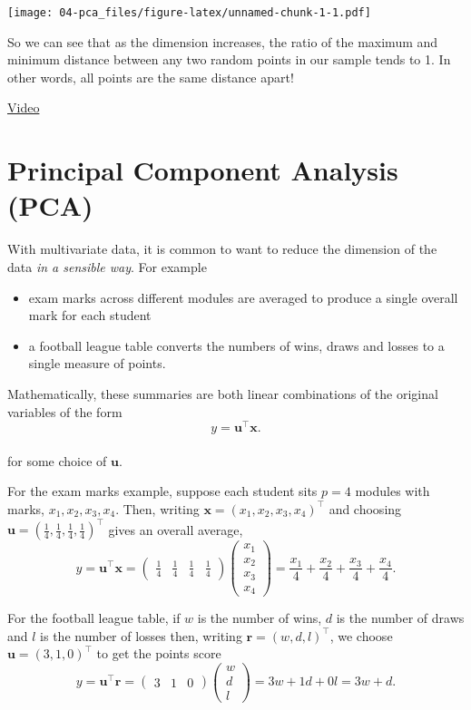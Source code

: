 \documentclass[]{book}
\theoremstyle{definition}
\theoremstyle{definition}
\theoremstyle{definition}
\theoremstyle{remark}
\begin{document}
\texttt{[image: 04-pca\_files/figure-latex/unnamed-chunk-1-1.pdf]}

So we can see that as the dimension increases, the ratio of the maximum and minimum distance between any two random points in our sample tends to 1. In other words, all points are the same distance apart!

\href{https://mediaspace.nottingham.ac.uk/media/Part+IIA+Dimension+reduction+introduction/1_0s2cgr1r}{Video}

\hypertarget{pca}{%
\chapter{Principal Component Analysis (PCA)}\label{pca}}

With multivariate data, it is common to want to reduce the dimension of the data \emph{in a sensible way}. For example

\begin{itemize}
\item
  exam marks across different modules are
  averaged to produce a single overall mark for each
  student
\item
  a football league table converts the
  numbers of wins, draws and losses to a single measure of
  points.
\end{itemize}

Mathematically, these summaries
are both linear combinations of the
original variables of the form
\[y = \mathbf u^\top \mathbf x.\]\\
for some choice of \(\mathbf u\).

For the exam marks example, suppose each student sits \(p=4\) modules
with marks, \(x_1,x_2,x_3,x_4\). Then, writing \(\mathbf x=(x_1, x_2 , x_3, x_4)^\top\) and choosing \(\mathbf u= \left(\frac{1}{4}, \frac{1}{4}, \frac{1}{4}, \frac{1}{4} \right)^\top\)
gives an overall average,
\[ y =\mathbf u^\top \mathbf x= \begin{pmatrix} \frac{1}{4} & \frac{1}{4} & \frac{1}{4} & \frac{1}{4} \end{pmatrix} \begin{pmatrix} x_1 \\ x_2 \\ x_3 \\ x_4 \end{pmatrix} = \frac{x_1}{4} + \frac{x_2}{4} + \frac{x_3}{4} + \frac{x_4}{4}.\]

For the football league table, if \(w\) is the number of wins, \(d\) is the number of draws and \(l\) is the number of losses then, writing
\({\mathbf r}=(w,d,l)^\top\), we choose \(\mathbf u= \left(3,1,0 \right)^\top\) to get the points score
\[ y = \mathbf u^\top {\mathbf r}=\begin{pmatrix} 3 & 1 & 0 \end{pmatrix} \begin{pmatrix} w \\ d \\ l \end{pmatrix} = 3w + 1d + 0l=3w+d.\]
\end{document}
